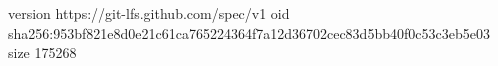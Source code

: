 version https://git-lfs.github.com/spec/v1
oid sha256:953bf821e8d0e21c61ca765224364f7a12d36702cec83d5bb40f0c53c3eb5e03
size 175268
